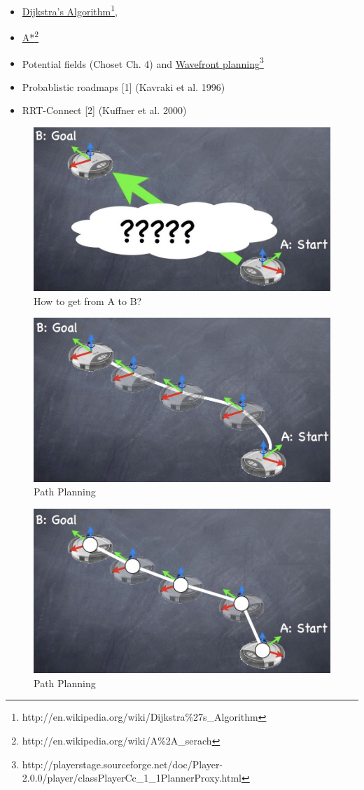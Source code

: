 \begin{itemize}
\item \href{http://en.wikipedia.org/wiki/Dijkstra\%27s\_Algorithm}{Dijkstra's Algorithm}\footnote{http://en.wikipedia.org/wiki/Dijkstra\%27s\_Algorithm}, 
\item \href{http://en.wikipedia.org/wiki/A\%2A\_search}{A*}\footnote{http://en.wikipedia.org/wiki/A\%2A\_serach}
\item Potential fields (Choset Ch. 4) and \href{http://playerstage.sourceforge.net/doc/Player-2.0.0/player/classPlayerCc\_1\_1PlannerProxy.html}{Wavefront planning}\footnote{http://playerstage.sourceforge.net/doc/Player-2.0.0/player/classPlayerCc\_1\_1PlannerProxy.html}
\item Probablistic roadmaps [1] (Kavraki et al. 1996) 
\item RRT-Connect [2] (Kuffner et al. 2000)
\end{itemize}

\begin{figure}[!h]
\centering
\includegraphics[width=0.6\columnwidth]{figures/7_planning1.jpg}
\caption{How to get from A to B?}
\end{figure}

\begin{figure}[!h]
\centering
\includegraphics[width=0.6\columnwidth]{figures/7_planning2.jpg}
\caption{Path Planning}
\end{figure}

\begin{figure}[!h]
\centering
\includegraphics[width=0.6\columnwidth]{figures/7_planning3.jpg}
\caption{Path Planning}
\end{figure}

